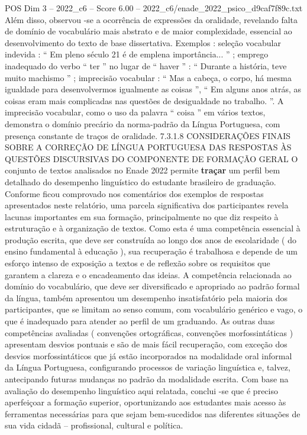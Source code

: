 \begin{textsample}{POS Dim 3 – 2022\_c6 – Score 6.00 – 2022\_c6/enade\_2022\_psico\_d9caf7f89c.txt}
Além disso, observou -se a ocorrência de expressões da oralidade, revelando falta de domínio de vocabulário mais abstrato e de maior complexidade, essencial ao desenvolvimento do texto de base dissertativa.
Exemplos : seleção vocabular indevida : “ Em pleno século 21 é de emplena importância... ” ; emprego inadequado do verbo “ ter ” no lugar de “ haver ” : “ Durante a história, teve muito machismo ” ; imprecisão vocabular : “ Mas a cabeça, o corpo, há mesma igualdade para desenvolvermos igualmente as coisas ”, “ Em alguns anos atrás, as coisas eram mais complicadas nas questões de desigualdade no trabalho. ”.
A imprecisão vocabular, como o uso da palavra “ coisa ” em vários textos, demonstra o domínio precário da norma-padrão da Língua Portuguesa, com presença constante de traços de oralidade. 7.3.1.8 CONSIDERAÇÕES FINAIS SOBRE A CORREÇÃO DE LÍNGUA PORTUGUESA DAS RESPOSTAS ÀS QUESTÕES DISCURSIVAS DO COMPONENTE DE FORMAÇÃO GERAL O conjunto de textos analisados no Enade 2022 permite \textbf{traçar} um perfil bem detalhado do desempenho linguístico do estudante brasileiro de graduação.
Conforme ficou comprovado nos comentários dos exemplos de respostas apresentados neste relatório, uma parcela significativa dos participantes revela lacunas importantes em sua formação, principalmente no que diz respeito à estruturação e à organização de textos.
Como esta é uma competência essencial à produção escrita, que deve ser construída ao longo dos anos de escolaridade ( do ensino fundamental à educação ), sua recuperação é trabalhosa e depende de um esforço intenso de exposição a textos e de reflexão sobre os requisitos que garantem a clareza e o encadeamento das ideias.
A competência relacionada ao domínio do vocabulário, que deve ser diversificado e apropriado ao padrão formal da língua, também apresentou um desempenho insatisfatório pela maioria dos participantes, que se limitam ao senso comum, com vocabulário genérico e vago, o que é inadequado para atender ao perfil de um graduando.
As outras duas competências avaliadas ( convenções ortográficas, convenções morfossintáticas ) apresentam desvios pontuais e são de mais fácil recuperação, com exceção dos desvios morfossintáticos que já estão incorporados na modalidade oral informal da Língua Portuguesa, configurando processos de variação linguística e, talvez, antecipando futuras mudanças no padrão da modalidade escrita.
Com base na avaliação do desempenho linguístico aqui relatada, conclui -se que é preciso aperfeiçoar a formação superior, oportunizando aos estudantes mais acesso às ferramentas necessárias para que sejam bem-sucedidos nas diferentes situações de sua vida cidadã – profissional, cultural e política.

\end{textsample}
